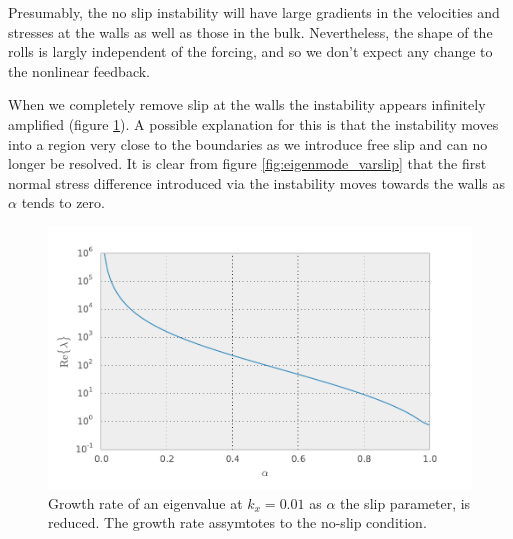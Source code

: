 \documentclass{jfm}
\begin{document}
Presumably, the no slip instability will have large gradients in the velocities
and stresses at the walls as well as those in the bulk. Nevertheless, the shape
of the rolls is largly independent of the forcing, and so we don't expect any
change to the nonlinear feedback.

When we completely remove slip at the walls the instability appears infinitely
amplified (figure \ref{fig:evaldiverg_varslip}). A possible explanation for
this is that the instability moves into a region very close to the boundaries
as we introduce free slip and can no longer be resolved. It is clear from
figure \ref{fig:eigenmode_varslip} that the first normal stress difference
introduced via the instability moves towards the walls as $\alpha$ tends to
zero.

\begin{figure}
    \centering
    \includegraphics[width=\textwidth]{./figures/vara_ev_kx001_Wi2_log}
    \caption{
	Growth rate of an eigenvalue at $k_x=0.01$ as $\alpha$ the slip
	parameter, is reduced. The growth rate assymtotes to the no-slip
	condition.
    }
    \label{fig:evaldiverg_varslip}
\end{figure}
\end{document}
